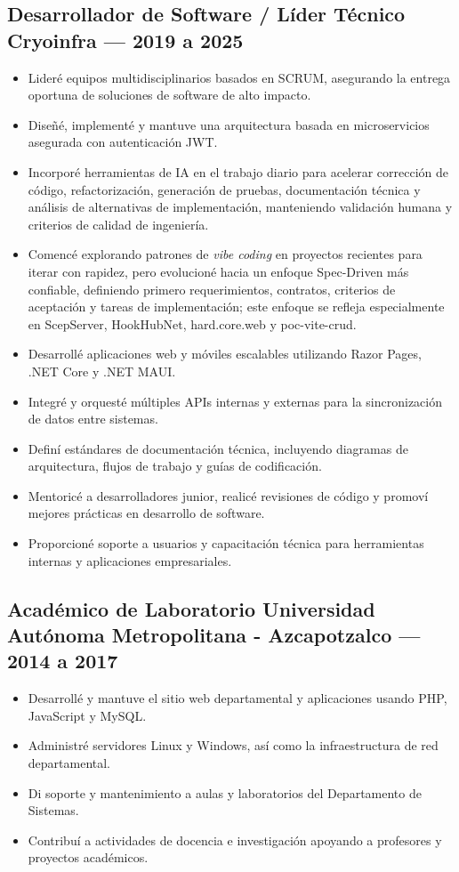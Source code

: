 \subsection*{Desarrollador de Software / Líder Técnico \hfill Cryoinfra — 2019 a 2025}
\begin{itemize}[leftmargin=12pt]
    \item Lideré equipos multidisciplinarios basados en SCRUM, asegurando la entrega oportuna de soluciones de software de alto impacto.
    \item Diseñé, implementé y mantuve una arquitectura basada en microservicios asegurada con autenticación JWT.
    \item Incorporé herramientas de IA en el trabajo diario para acelerar corrección de código, refactorización, generación de pruebas, documentación técnica y análisis de alternativas de implementación, manteniendo validación humana y criterios de calidad de ingeniería.
    \item Comencé explorando patrones de \textit{vibe coding} en proyectos recientes para iterar con rapidez, pero evolucioné hacia un enfoque Spec-Driven más confiable, definiendo primero requerimientos, contratos, criterios de aceptación y tareas de implementación; este enfoque se refleja especialmente en ScepServer, HookHubNet, hard.core.web y poc-vite-crud.
    \item Desarrollé aplicaciones web y móviles escalables utilizando Razor Pages, .NET Core y .NET MAUI.
    \item Integré y orquesté múltiples APIs internas y externas para la sincronización de datos entre sistemas.
    \item Definí estándares de documentación técnica, incluyendo diagramas de arquitectura, flujos de trabajo y guías de codificación.
    \item Mentoricé a desarrolladores junior, realicé revisiones de código y promoví mejores prácticas en desarrollo de software.
    \item Proporcioné soporte a usuarios y capacitación técnica para herramientas internas y aplicaciones empresariales.
\end{itemize}

\subsection*{Académico de Laboratorio \hfill Universidad Autónoma Metropolitana - Azcapotzalco — 2014 a 2017}
\begin{itemize}[leftmargin=12pt]
    \item Desarrollé y mantuve el sitio web departamental y aplicaciones usando PHP, JavaScript y MySQL.
    \item Administré servidores Linux y Windows, así como la infraestructura de red departamental.
    \item Di soporte y mantenimiento a aulas y laboratorios del Departamento de Sistemas.
    \item Contribuí a actividades de docencia e investigación apoyando a profesores y proyectos académicos.
\end{itemize}


